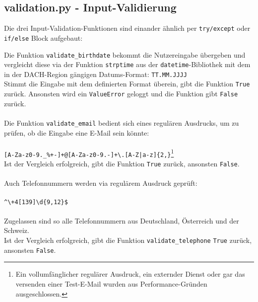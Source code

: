 
        \subsection{validation.py - Input-Validierung} \label{Implementierung: validation.py}
            Die drei Input-Validation-Funktionen sind einander ähnlich per \verb|try/except| oder \verb|if/else| Block aufgebaut:

            Die Funktion \verb|validate_birthdate| bekommt die Nutzereingabe übergeben und vergleicht diese via der Funktion \verb|strptime| aus der \verb|datetime|-Bibliothek \cite{datetime} mit dem in der DACH-Region gängigen Datums-Format: \verb|TT.MM.JJJJ| \\
            Stimmt die Eingabe mit dem definierten Format überein, gibt die Funktion \verb|True| zurück. Ansonsten wird ein \verb|ValueError| geloggt und die Funktion gibt \verb|False| zurück.\\ 
            \\
            Die Funktion \verb|validate_email| bedient sich eines regulären Ausdrucks, um zu prüfen, ob die Eingabe eine E-Mail sein könnte: \\
            \\
            \verb/[A-Za-z0-9._%+-]+@[A-Za-z0-9.-]+\.[A-Z|a-z]{2,}/\footnote{Ein vollumfänglicher regulärer Ausdruck, ein externder Dienst oder gar das versenden einer Test-E-Mail wurden aus Performance-Gründen ausgeschlossen.} \\ 

            Ist der Vergleich erfolgreich, gibt die Funktion \verb|True| zurück, ansonsten \verb|False|. \\
            \\
            Auch Telefonnummern werden via regulärem Ausdruck geprüft: \\
            \\\verb/^\+4[139]\d{9,12}$/ \\
            \\
            Zugelassen sind so alle Telefonnummern aus Deutschland, Österreich und der Schweiz.\\
            Ist der Vergleich erfolgreich, gibt die Funktion \verb|validate_telephone| \verb|True| zurück, ansonsten \verb|False|.
        

